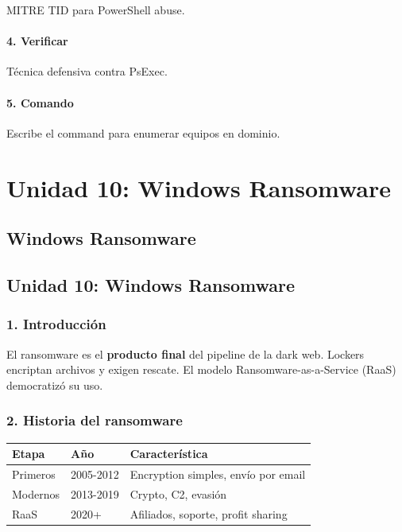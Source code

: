 \documentclass[
  letterpaper,
]{report}
\newcounter{none} %
\begin{document}
MITRE TID para PowerShell abuse.

\subsection{4. Verificar}\label{verificar-2}

Técnica defensiva contra PsExec.

\subsection{5. Comando}\label{comando-7}

Escribe el command para enumerar equipos en dominio.

\part{Unidad 10: Windows Ransomware}

\chapter{Windows Ransomware}\label{windows-ransomware}

\chapter{Unidad 10: Windows
Ransomware}\label{unidad-10-windows-ransomware-1}

\section{1. Introducción}\label{introducciuxf3n-9}

El ransomware es el \textbf{producto final} del pipeline de la dark web.
Lockers encriptan archivos y exigen rescate. El modelo
Ransomware-as-a-Service (RaaS) democratizó su uso.

\section{2. Historia del ransomware}\label{historia-del-ransomware}

{\def\LTcaptype{none} %
\begin{longtable}[]{@{}lll@{}}
\toprule\noalign{}
Etapa & Año & Característica \\
\midrule\noalign{}
\endhead
\bottomrule\noalign{}
\endlastfoot
Primeros & 2005-2012 & Encryption simples, envío por email \\
Modernos & 2013-2019 & Crypto, C2, evasión \\
RaaS & 2020+ & Afiliados, soporte, profit sharing \\
\end{longtable}
}
\end{document}
